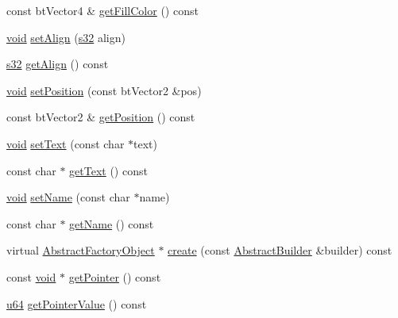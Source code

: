 \begin{DoxyCompactItemize}
\item 
const bt\+Vector4 \& \mbox{\hyperlink{classnjli_1_1_label_h_u_d_a3098da90340c9cbbe8ec1c1f35ab18d4}{get\+Fill\+Color}} () const
\item 
\mbox{\hyperlink{_thread_8h_af1e856da2e658414cb2456cb6f7ebc66}{void}} \mbox{\hyperlink{classnjli_1_1_label_h_u_d_a6950d61495c1391048e780c1de548519}{set\+Align}} (\mbox{\hyperlink{_util_8h_aa62c75d314a0d1f37f79c4b73b2292e2}{s32}} align)
\item 
\mbox{\hyperlink{_util_8h_aa62c75d314a0d1f37f79c4b73b2292e2}{s32}} \mbox{\hyperlink{classnjli_1_1_label_h_u_d_a970d0a47b794659a5e1c3b58e07c239e}{get\+Align}} () const
\item 
\mbox{\hyperlink{_thread_8h_af1e856da2e658414cb2456cb6f7ebc66}{void}} \mbox{\hyperlink{classnjli_1_1_label_h_u_d_a196a78a5fb764d5e14287d593a442c89}{set\+Position}} (const bt\+Vector2 \&pos)
\item 
const bt\+Vector2 \& \mbox{\hyperlink{classnjli_1_1_label_h_u_d_a55a3f0c4c64bf7e0a5c510500f3288fe}{get\+Position}} () const
\item 
\mbox{\hyperlink{_thread_8h_af1e856da2e658414cb2456cb6f7ebc66}{void}} \mbox{\hyperlink{classnjli_1_1_label_h_u_d_aa41b131ee1d33967a5aa23ebbf459387}{set\+Text}} (const char $\ast$text)
\item 
const char $\ast$ \mbox{\hyperlink{classnjli_1_1_label_h_u_d_a600c970bbab43aebdd7d72e75c9519df}{get\+Text}} () const
\item 
\mbox{\hyperlink{_thread_8h_af1e856da2e658414cb2456cb6f7ebc66}{void}} \mbox{\hyperlink{classnjli_1_1_label_h_u_d_a087eb5f8d9f51cc476f12f1d10a3cb95}{set\+Name}} (const char $\ast$name)
\item 
const char $\ast$ \mbox{\hyperlink{classnjli_1_1_label_h_u_d_ad41266885be835f3ee602311e20877a4}{get\+Name}} () const
\item 
virtual \mbox{\hyperlink{classnjli_1_1_abstract_factory_object}{Abstract\+Factory\+Object}} $\ast$ \mbox{\hyperlink{classnjli_1_1_label_h_u_d_a83a8876ae63b92804004cf3febe76573}{create}} (const \mbox{\hyperlink{classnjli_1_1_abstract_builder}{Abstract\+Builder}} \&builder) const
\item 
const \mbox{\hyperlink{_thread_8h_af1e856da2e658414cb2456cb6f7ebc66}{void}} $\ast$ \mbox{\hyperlink{classnjli_1_1_label_h_u_d_ac4ca71716ed832be357f15f8262c8448}{get\+Pointer}} () const
\item 
\mbox{\hyperlink{_util_8h_ad758b7a5c3f18ed79d2fcd23d9f16357}{u64}} \mbox{\hyperlink{classnjli_1_1_label_h_u_d_a4ffddf141a426a5a07d0ac19f1913811}{get\+Pointer\+Value}} () const

\end{DoxyCompactItemize}
